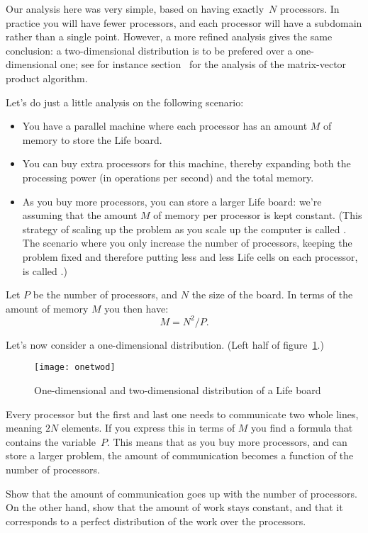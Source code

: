 Our analysis here was very simple, based on having exactly~$N$ processors.
In practice you will have fewer processors, and each processor will
have a subdomain rather than a single point.
However, a more refined analysis gives the same conclusion:
a two-dimensional distribution is to be prefered over a one-dimensional one;
see for instance section~ for the analysis
of the matrix-vector product algorithm.

Let's do just a little analysis on the following scenario:
\begin{itemize}
\item You have a parallel machine where each processor has an amount
  $M$ of memory to store the Life board.
\item You can buy extra processors for this machine, thereby expanding
  both the processing power (in operations per second) and the total
  memory.
\item As you buy more processors, you can store a larger Life board:
  we're assuming that the amount $M$ of memory per processor is kept constant. (This
  strategy of scaling up the problem as you scale up the computer is
  called . The scenario where you only
  increase the number of processors, keeping the problem fixed and
  therefore putting less and less Life cells on each processor,
  is called .)
\end{itemize}

Let $P$ be the number of processors, and $N$ the size of the
board. In terms of the amount of memory $M$ you then have:
\[ M=N^2/P. \]

Let's now consider a one-dimensional distribution. (Left half of figure~\ref{fig:onetwod}.)
\begin{figure}[ht]
  \texttt{[image: onetwod]}
  \caption{One-dimensional and two-dimensional distribution of a Life board}
  \label{fig:onetwod}
\end{figure}
Every processor but
the first and last one needs to communicate two whole lines, meaning
$2N$ elements. If you express this in terms of $M$ you find a formula
that contains the variable~$P$. This means that as you buy more
processors, and can store a larger problem, the amount of
communication becomes a function of the number of processors.

\begin{exercise}
  Show that the amount of communication goes up with the number of
  processors. On the other hand, show that the amount of work stays
  constant, and that it corresponds to a perfect distribution of the
  work over the processors.
\end{exercise}

